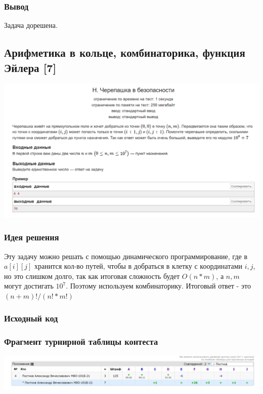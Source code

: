 \subsubsection*{Вывод}
Задача дорешена.

\vspace{20pt}

\pagebreak


\subsection*{Арифметика в кольце, комбинаторика, функция Эйлера [7]}
\begin{center}
\includegraphics[width=\textwidth]{statements/7.png}
\end{center}
\subsubsection*{Идея решения}
Эту задачу можно решать с помощью динамического программирование, где в $a[i][j]$ хранится кол-во путей, чтобы в добраться в клетку с координатами $i, j$, но это слишком долго, так как итоговая сложность будет $O(n * m)$, а $n, m$ могут достигать $10^7$. Поэтому используем комбинаторику. Итоговый ответ - это $(n + m)!/(n!*m!)$
\subsubsection*{Исходный код}


\subsubsection*{Фрагмент турнирной таблицы контеста}
\begin{center}
\includegraphics[width=\textwidth]{standings/7.png}\newline\noindent
\end{center}

